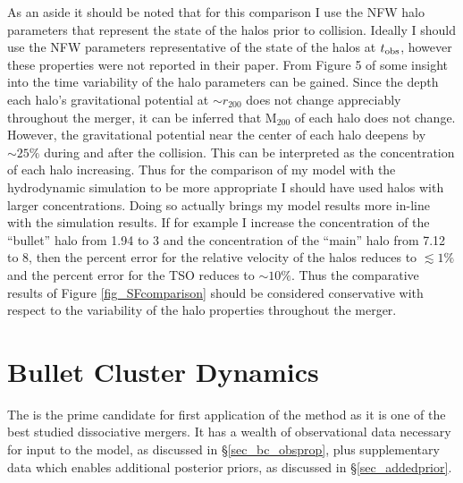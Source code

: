 As an aside it should be noted that for this comparison I use the \citet{Springel:2007bg} NFW halo parameters that represent the state of the halos prior to collision.
Ideally I should use the NFW parameters representative of the state of the halos at $t_{\rm obs}$, however these properties were not reported in their paper.
From Figure 5 of \citet{Springel:2007bg} some insight into the time variability of the halo parameters can be gained.
Since the depth each halo's gravitational potential at $\sim r_{200}$ does not change appreciably throughout the merger, it can be inferred that M$_{200}$ of each halo does not change. 
However, the gravitational potential near the center of each halo deepens by $\sim 25\%$ during and after the collision.
This can be interpreted as the concentration of each halo increasing.
Thus for the comparison of my model with the \citet{Springel:2007bg} hydrodynamic simulation to be more appropriate I should have used halos with larger concentrations.
Doing so actually brings my model results more in-line with the simulation results.
If for example I increase the concentration of the ``bullet'' halo from 1.94 to 3 and the concentration of the ``main'' halo from 7.12 to 8, then the percent error for the relative velocity of the halos reduces to $\lesssim 1\%$ and the percent error for the TSO reduces to $\sim 10\%$. 
Thus the comparative results of Figure \ref{fig_SFcomparison} should be considered conservative with respect to the variability of the halo properties throughout the merger.

%


\section{Bullet Cluster Dynamics}\label{sec_bullet}

The  is the prime candidate for first application of the method as it is one of the best studied dissociative mergers.
It has a wealth of observational data necessary for input to the model, as discussed in \S\ref{sec_bc_obsprop}, plus supplementary data which enables additional posterior priors, as discussed in \S\ref{sec_addedprior}.

